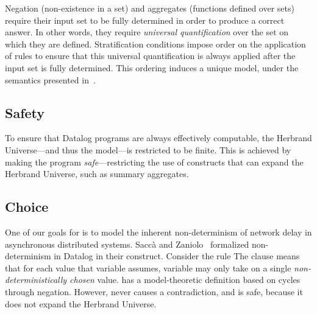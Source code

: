 Negation (non-existence in a set) and aggregates (functions defined over sets)
require their input set to be fully determined in order to produce a correct
answer.  In other words, they require {\em universal quantification} over the
set on which they are defined.  Stratification conditions impose order on the
application of rules to ensure that this universal quantification is always
applied after the input set is fully determined.  This ordering induces a
unique model, under the semantics presented in~\cite{wellfounded}.

\subsection{Safety}

To ensure that Datalog programs are always effectively computable, the Herbrand
Universe---and thus the model---is restricted to be finite.  This is
achieved by making the program {\em safe}---restricting the use of constructs
that can expand the Herbrand Universe, such as summary aggregates.


\subsection{Choice}

One of our goals for \lang is to model the inherent non-determinism of network
delay in asynchronous distributed systems.  Sacc\`{a} and
Zaniolo~\cite{sacca-zaniolo} formalized non-determinism in Datalog in their
 construct.  Consider the rule  The  clause means that for each
value that variable  assumes, variable  may only take on
a single {\em non-deterministically chosen} value.   has a
model-theoretic definition based on cycles through negation.  However, 
never causes a contradiction, and is safe, because it does not expand the
Herbrand Universe.


